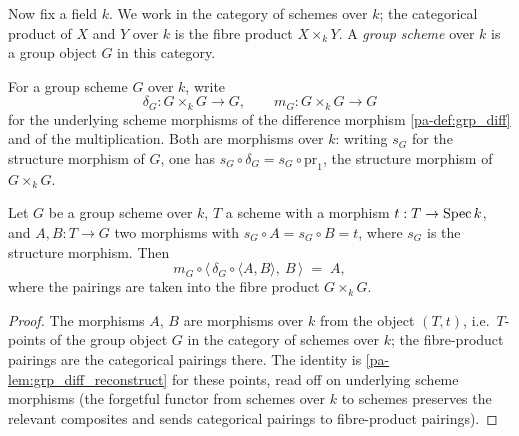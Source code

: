 Now fix a field \(k\). We work in the category of schemes over \(k\); the
categorical product of \(X\) and \(Y\) over \(k\) is the fibre product
\(X \times_k Y\). A \emph{group scheme} over \(k\) is a group object \(G\) in
this category.

\begin{definition}
  \label{pa-def:grp_scheme_diff}
  \leanok

  For a group scheme \(G\) over \(k\), write
  \[
    \delta_G : G \times_k G \longrightarrow G,
    \qquad
    m_G : G \times_k G \longrightarrow G
  \]
  for the underlying scheme morphisms of the difference morphism
  \ref{pa-def:grp_diff} and of the multiplication. Both are morphisms over \(k\):
  writing \(s_G\) for the structure morphism of \(G\), one has
  \(s_G \circ \delta_G = s_G \circ \mathrm{pr}_1\), the structure morphism of
  \(G \times_k G\).
\end{definition}

\begin{lemma}
  \label{pa-lem:grp_scheme_diff_reconstruct}
  \leanok

  Let \(G\) be a group scheme over \(k\), \(T\) a scheme with a morphism
  \(t : T \to \operatorname{Spec} k\), and \(A, B : T \to G\) two morphisms with
  \(s_G \circ A = s_G \circ B = t\), where \(s_G\) is the structure morphism.
  Then
  \[
    m_G \circ \bigl\langle\, \delta_G \circ \langle A, B\rangle,\ B \,\bigr\rangle
    \;=\; A ,
  \]
  where the pairings are taken into the fibre product \(G \times_k G\).
\end{lemma}
\begin{proof}
  \leanok
  The morphisms \(A\), \(B\) are morphisms over \(k\) from the object
  \((T, t)\), i.e.\ \(T\)-points of the group object \(G\) in the category of
  schemes over \(k\); the fibre-product pairings are the categorical pairings
  there. The identity is \ref{pa-lem:grp_diff_reconstruct} for these points, read
  off on underlying scheme morphisms (the forgetful functor from schemes over
  \(k\) to schemes preserves the relevant composites and sends categorical
  pairings to fibre-product pairings).
\end{proof}

